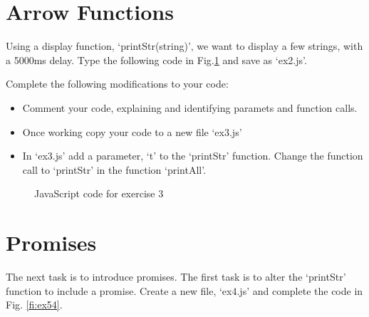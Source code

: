 \newpage
\section{Arrow Functions}
Using a display function, `printStr(string)', we want to display a few strings, with a 5000ms delay. Type the following code in Fig.\ref{fi:ex52} and save as `ex2.js'.

Complete the following modifications to your code:
\begin{itemize}
	\item Comment your code, explaining and identifying paramets and function calls.
	\item Once working copy your code to a new file `ex3.js'
	\item In `ex3.js' add a parameter, `t' to the `printStr' function. Change the function call to `printStr' in the function `printAll'.
\end{itemize}

\begin{figure}[t!]
	\centering

	\caption{JavaScript code for exercise 3}
	\label{fi:ex52}
\end{figure}


%

\newpage
\section{Promises}
The next task is to introduce promises. The first task is to alter the `printStr' function to include a promise. Create a new file, `ex4.js' and complete the code in Fig. \ref{fi:ex54}. %

